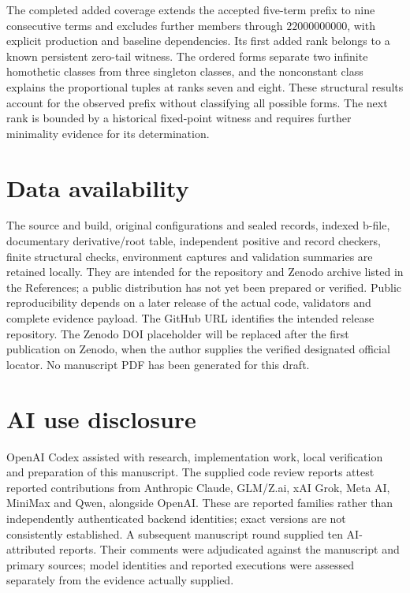 \documentclass[11pt]{article}
\theoremstyle{definition}
\theoremstyle{remark}
\begin{document}
The completed added coverage extends the accepted five-term
prefix to nine consecutive terms and excludes further members
through $22000000000$, with explicit production and baseline
dependencies. Its first added rank belongs to a known persistent
zero-tail witness. The ordered forms separate two infinite
homothetic classes from three singleton classes, and the
nonconstant class explains the proportional tuples at ranks seven
and eight. These structural results account for the observed
prefix without classifying all possible forms. The next rank is
bounded by a historical fixed-point witness and requires further
minimality evidence for its determination.

\section*{Data availability}

The source and build, original configurations and sealed records,
indexed b-file, documentary derivative/root table, independent
positive and record checkers, finite structural checks, environment
captures and validation summaries are retained locally. They are
intended for the repository and Zenodo archive listed in the
References; a public distribution has not yet been prepared or
verified. Public reproducibility depends on a later release of
the actual code, validators and complete evidence payload.
The GitHub URL identifies the intended release repository. The
Zenodo DOI placeholder will be replaced after the first publication
on Zenodo, when the author supplies the verified designated official
locator. No manuscript PDF has been generated for this draft.

\section*{AI use disclosure}

OpenAI Codex assisted with research, implementation work, local
verification and preparation of this manuscript. The supplied code
review reports attest reported contributions from Anthropic Claude,
GLM/Z.ai, xAI Grok, Meta AI, MiniMax and Qwen, alongside OpenAI.
These are reported families rather than independently authenticated
backend identities; exact versions are not consistently established.
A subsequent manuscript round supplied ten AI-attributed reports.
Their comments were adjudicated against the manuscript and primary
sources; model identities and reported executions were assessed
separately from the evidence actually supplied.
\end{document}
